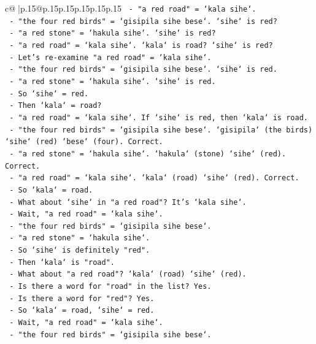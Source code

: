 \documentclass{article}
\begin{document}
{\begin{supertabular}{c@{$\;$}|p{.15\linewidth}@{}p{.15\linewidth}p{.15\linewidth}p{.15\linewidth}p{.15\linewidth}p{.15\linewidth}}
{{{\texttt{  {-} "a red road" = `kala sihe`.} \\
\texttt{  {-} "the four red birds" = `gisipila sihe bese`. `sihe` is red?} \\
\texttt{  {-} "a red stone" = `hakula sihe`. `sihe` is red?} \\
\texttt{  {-} "a red road" = `kala sihe`. `kala` is road? `sihe` is red?} \\
\texttt{  {-} Let's re{-}examine "a red road" = `kala sihe`.} \\
\texttt{  {-} "the four red birds" = `gisipila sihe bese`. `sihe` is red.} \\
\texttt{  {-} "a red stone" = `hakula sihe`. `sihe` is red.} \\
\texttt{  {-} So `sihe` = red.} \\
\texttt{  {-} Then `kala` = road?} \\
\texttt{  {-} "a red road" = `kala sihe`. If `sihe` is red, then `kala` is road.} \\
\texttt{  {-} "the four red birds" = `gisipila sihe bese`. `gisipila` (the birds) `sihe` (red) `bese` (four). Correct.} \\
\texttt{  {-} "a red stone" = `hakula sihe`. `hakula` (stone) `sihe` (red). Correct.} \\
\texttt{  {-} "a red road" = `kala sihe`. `kala` (road) `sihe` (red). Correct.} \\
\texttt{  {-} So `kala` = road.} \\
\texttt{  {-} What about `sihe` in "a red road"? It's `kala sihe`.} \\
\texttt{  {-} Wait, "a red road" = `kala sihe`.} \\
\texttt{  {-} "the four red birds" = `gisipila sihe bese`.} \\
\texttt{  {-} "a red stone" = `hakula sihe`.} \\
\texttt{  {-} So `sihe` is definitely "red".} \\
\texttt{  {-} Then `kala` is "road".} \\
\texttt{  {-} What about "a red road"? `kala` (road) `sihe` (red).} \\
\texttt{  {-} Is there a word for "road" in the list? Yes.} \\
\texttt{  {-} Is there a word for "red"? Yes.} \\
\texttt{  {-} So `kala` = road, `sihe` = red.} \\
\texttt{  {-} Wait, "a red road" = `kala sihe`.} \\
\texttt{  {-} "the four red birds" = `gisipila sihe bese`.} \\
}}}
\end{supertabular}}
\end{document}
